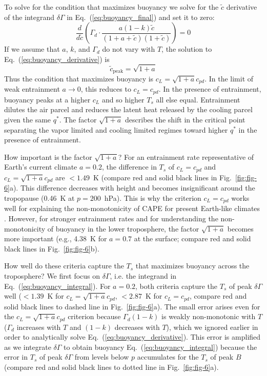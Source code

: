 \documentclass[]{ametsocV6.1}
\begin{document}
To solve for the condition that maximizes buoyancy we solve for the $\tilde{c}$ derivative of the integrand $\delta \Gamma$ in Eq.~(\ref{eq:buoyancy_final}) and set it to zero:
\begin{equation}
    \frac{d}{d \tilde{c}}\left(\Gamma_d \cdot \frac{a(1-k)\tilde{c}}{(1+a+\tilde{c})(1+\tilde{c})}\right) = 0 \label{eq:buoyancy_derivative}
\end{equation}
If we assume that $a$, $k$, and $\Gamma_d$ do not vary with $T$, the solution to Eq.~(\ref{eq:buoyancy_derivative}) is
\begin{equation}
    \tilde{c}_\text{peak}=\sqrt{1+a} \label{eq:buoyancy_quadratic}
\end{equation}
Thus the condition that maximizes buoyancy is $c_L = \sqrt{1+a} c_{pd}$. In the limit of weak entrainment $a \to 0$, this reduces to $c_L = c_{pd}$. In the presence of entrainment, buoyancy peaks at a higher $c_L$ and so higher $T_s$ all else equal. Entrainment dilutes the air parcel and reduces the latent heat released by the cooling parcel given the same $q^*$. The factor $\sqrt{1+a}$ describes the shift in the critical point separating the vapor limited and cooling limited regimes toward higher $q^*$ in the presence of entrainment.

How important is the factor $\sqrt{1+a}$? For an entrainment rate representative of Earth's current climate $a=0.2$, the difference in $T_s$ of $c_L=c_{pd}$ and $c_L=\sqrt{1+a}c_{pd}$ are $< 1.49$~K (compare red and solid black lines in Fig.~\ref{fig:fig-6}a). This difference decreases with height and becomes insignificant around the tropopause (0.46~K at $p=200$~hPa). This is why the criterion $c_L = c_{pd}$ works well for explaining the non-monotonicity of CAPE for present Earth-like climates \citep{romps2016}. However, for stronger entrainment rates and for understanding the non-monotonicity of buoyancy in the lower troposphere, the factor $\sqrt{1+a}$ becomes more important (e.g., 4.38~K for $a=0.7$ at the surface; compare red and solid black lines in Fig.~\ref{fig:fig-6}b).

How well do these criteria capture the $T_s$ that maximizes buoyancy across the troposphere? We first focus on $\delta \Gamma$, i.e. the integrand in Eq.~(\ref{eq:buoyancy_integral}). For $a=0.2$, both criteria capture the $T_s$ of peak $\delta \Gamma$ well ($<1.39$~K for $c_L=\sqrt{1+a}c_{pd}$, $< 2.87$~K for $c_L=c_{pd}$, compare red and solid black lines to dashed line in Fig.~\ref{fig:fig-6}a). The small error arises even for the $c_L=\sqrt{1+a}c_{pd}$ criterion because $\Gamma_d(1-k)$ is weakly non-monotonic with $T$ ($\Gamma_d$ increases with $T$ and $(1-k)$ decreases with $T$), which we ignored earlier in order to analytically solve Eq.~(\ref{eq:buoyancy_derivative}). This error is amplified as we integrate $\delta \Gamma$ to obtain buoyancy Eq.~(\ref{eq:buoyancy_integral}) because the error in $T_s$ of peak $\delta \Gamma$ from levels below $p$ accumulates for the $T_s$ of peak $B$ (compare red and solid black lines to dotted line in Fig.~\ref{fig:fig-6}a).
\end{document}
